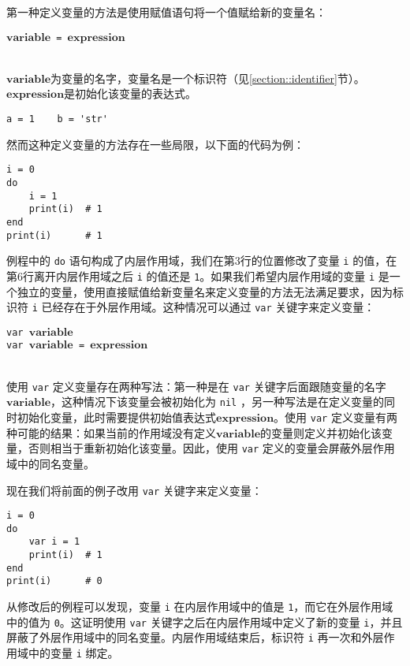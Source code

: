 第一种定义变量的方法是使用赋值语句将一个值赋给新的变量名：
\begin{algorithm}
$\bm{variable}$\texttt{ = }$\bm{expression}$
\end{algorithm}\vspace{-0.6em}\\
$\bm{variable}$为变量的名字，变量名是一个标识符（见\ref{section::identifier}节）。$\bm{expression}$是初始化该变量的表达式。
\begin{lstlisting}[language=berry, numbers=none]
a = 1    b = 'str'
\end{lstlisting}
然而这种定义变量的方法存在一些局限，以下面的代码为例：
\begin{lstlisting}[language=berry]
i = 0
do
    i = 1
    print(i)  # 1
end
print(i)      # 1
\end{lstlisting}
例程中的 \texttt{do} 语句构成了内层作用域，我们在第3行的位置修改了变量 \texttt{i} 的值，在第6行离开内层作用域之后 \texttt{i} 的值还是 \texttt{1}。如果我们希望内层作用域的变量 \texttt{i} 是一个独立的变量，使用直接赋值给新变量名来定义变量的方法无法满足要求，因为标识符 \texttt{i} 已经存在于外层作用域。这种情况可以通过 \texttt{var} 关键字来定义变量：
\begin{algorithm}
\texttt{var }$\bm{variable}$ \\
\texttt{var }$\bm{variable}$\texttt{ = }$\bm{expression}$
\end{algorithm}\vspace{-0.6em}\\
使用 \texttt{var} 定义变量存在两种写法：第一种是在 \texttt{var} 关键字后面跟随变量的名字$\bm{variable}$，这种情况下该变量会被初始化为 \texttt{nil} ，另一种写法是在定义变量的同时初始化变量，此时需要提供初始值表达式$\bm{expression}$。使用 \texttt{var} 定义变量有两种可能的结果：如果当前的作用域没有定义$\bm{variable}$的变量则定义并初始化该变量，否则相当于重新初始化该变量。因此，使用 \texttt{var} 定义的变量会屏蔽外层作用域中的同名变量。

现在我们将前面的例子改用 \texttt{var} 关键字来定义变量：
\begin{lstlisting}[language=berry]
i = 0
do
    var i = 1
    print(i)  # 1
end
print(i)      # 0
\end{lstlisting}
从修改后的例程可以发现，变量 \texttt{i} 在内层作用域中的值是 \texttt{1}，而它在外层作用域中的值为 \texttt{0}。这证明使用 \texttt{var} 关键字之后在内层作用域中定义了新的变量 \texttt{i}，并且屏蔽了外层作用域中的同名变量。内层作用域结束后，标识符 \texttt{i} 再一次和外层作用域中的变量 \texttt{i} 绑定。

